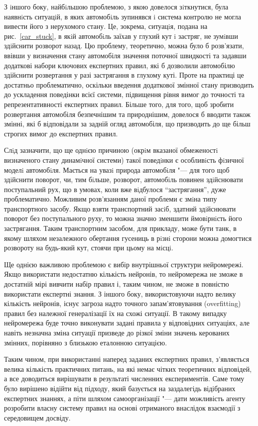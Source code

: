 \documentclass[a4paper,10pt]{article}
\begin{document}
З iншого боку, найбiльшою проблемою, з якою довелося зiткнутися, була наявнiсть ситуацiй, в яких автомобiль зупинявся i система контролю не могла вивести його з нерухомого стану. Це, зокрема, ситуацiя, подана на рис.~\ref{car_stuck}, в якiй автомобiль заїхав у глухий кут i застряг, не зумiвши здiйснити розворот назад. Цю проблему, теоретично, можна було б розв'язати, ввівши у визначення стану автомобіля значення поточної швидкості та задавши додаткові набори ключових експертних правил, які б дозволили автомобілю здійснити розвертання у разі застрягання в глухому куті. Проте на практиці це достатньо проблематично, оскільки введення додаткової змінної стану призводить до ускладення поведінки всієї системи, підвищення рівня вимог до точності та репрезентативності експертних правил. Більше того, для того, щоб зробити розвертання автомобіля безпечнішим та природнішим, довелося б вводити також змінні, які б відповідали за задній огляд автомобіля, що призводить до ще більш строгих вимог до експертних правил.

Слiд зазначити, що ще однiєю причиною (окрiм вказаної обмеженостi визначеного стану динамiчної системи) такої поведiнки є особливiсть фiзичної моделi автомобiля. Мається на увазi природа автомобiля "--- для того щоб здiйснити поворот, чи, тим бiльше, розворот, автомобiль повинен здiйснювати поступальний рух, що в умовах, коли вже вiдбулося ``застрягання'', дуже проблематично. Можливим розв’язанням даної проблеми є змiна типу транспортного засобу. Якщо взяти транспортний засiб, здатний здiйснювати поворот без поступального руху, то можна значно зменшити ймовiрнiсть його застрягання. Таким транспортним засобом, для прикладу, може бути танк, в якому шляхом незалежного обертання гусениць
в рiзнi сторони можна домогтися розвороту на будь-який кут, стоячи при цьому на мiсцi.

Ще однією важливою проблемою є вибір внутрішньої структури нейромережі. Якщо використати недостатню кількість нейронів, то нейромережа не зможе в достатній мірі вивчити набір правил і, таким чином, не зможе в повністю використати експертні знання. З іншого боку, використовуючи надто велику кількість нейронів, існує загроза надто точного запам'ятовування (overfitting) правил без належної генералізації їх на схожі ситуації. В такому випадку нейромережа буде точно виконувати задані правила у відповідних ситуаціях, але навіть незначна зміна ситуації призведе до різкої зміни значень керованих змінних, порівняно з близькою еталонною ситуацією. 

Таким чином, при використанні наперед заданих експертних правил, з'являється велика кількість практичних питань, на які немає чітких теоретичних відповідей, а все доводиться вирішувати в результаті численних експериментів. Саме тому було вирішено відійти від підходу, який базується на заздалегідь відібраних експертних знаннях, а піти шляхом самоорганізації "--- дати можливість агенту розробити власну систему правил на основі отриманого внаслідок взаємодії з середовищем досвіду.
\end{document}
